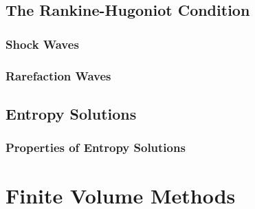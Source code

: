 \documentclass[
  fourColumns,
  landscape
]{formularyETH/formularyETH}
\begin{document}
  \subsection{The Rankine-Hugoniot Condition}\label{subsec:}
  
    \subsubsection{Shock Waves}\label{subsubsec:shock_waves}
    
    \label{subsubsec:lax_oleinik_entropy_condition}
      
    \subsubsection{Rarefaction Waves}\label{subsubsec:rarefaction_waves}
      
      
  \subsection{Entropy Solutions}\label{subsec:entropy_solutions}
        
      \subsubsection{Properties of Entropy Solutions}\label{subsubsec:properties_of_entropy_solutions}
        
      \label{subsubsubsec:lp-bound_on_entropy_solutions}
        
      \label{subsec:maximum_principle}
        
        
      \label{subsubsubsec:monotonicity_preservation}
        




\newpage
\section{Finite Volume Methods}\label{subsec:fvm}
  
\end{document}
